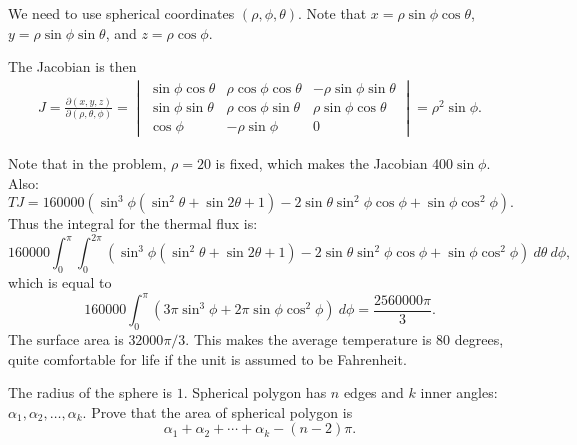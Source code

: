 \begin{solution}[name={Solution by Rchokler}]
	We need to use spherical coordinates $(\rho,\phi,\theta)$. Note that $x=\rho\sin\phi\cos\theta$, $y=\rho\sin\phi\sin\theta$, and $z=\rho\cos\phi$.
	
	The Jacobian is then 
	\begin{align*}
		J=\frac{\partial(x,y,z)}{\partial(\rho,\theta,\phi)}=
		\begin{vmatrix}
			\sin\phi\cos\theta & \rho\cos\phi\cos\theta & -\rho\sin\phi\sin\theta\\
			\sin\phi\sin\theta & \rho\cos\phi\sin\theta & \rho\sin\phi\cos\theta\\
			\cos\phi & -\rho\sin\phi & 0
		\end{vmatrix}=\rho^2\sin\phi.
	\end{align*}
	
	Note that in the problem, $\rho=20$ is fixed, which makes the Jacobian $400\sin\phi$.
	Also:
	\[TJ=160000\left(\sin^3\phi\left(\sin ^2\theta+\sin 2\theta+1\right)-2\sin\theta\sin^2\phi\cos\phi+\sin\phi\cos^2\phi\right).\]
	Thus the integral for the thermal flux is:
	\[160000\int_0^\pi\int_0^{2\pi}\left(\sin^3\phi\left(\sin ^2\theta+\sin 2\theta+1\right)-2\sin\theta\sin^2\phi\cos\phi+\sin\phi\cos^2\phi\right)\ d\theta\ d\phi,\]
	which is equal to \[160000\int_0^\pi(3\pi\sin^3\phi+2\pi\sin\phi\cos^2\phi)\ d\phi=\frac{2560000\pi}{3}.\]
	The surface area is $32000\pi/3$. This makes the average temperature is $80$ degrees, quite comfortable for life if the unit is assumed to be Fahrenheit.
\end{solution}





\begin{question}[name={Area of Spherical Polygon}] 
	The radius of the sphere is $1$. Spherical polygon has $n$ edges and $k$ inner angles: $\alpha_1, \alpha_2, \dots,\alpha_k$.
	Prove that the area of spherical polygon is $$\alpha_1+\alpha_2+\cdots+\alpha_k-(n-2)\pi.$$
\end{question}


